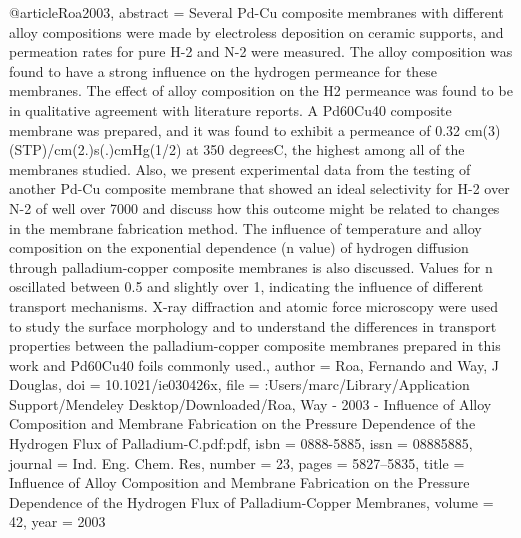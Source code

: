 @article{Roa2003,
abstract = {Several Pd-Cu composite membranes with different alloy compositions were made by electroless deposition on ceramic supports, and permeation rates for pure H-2 and N-2 were measured. The alloy composition was found to have a strong influence on the hydrogen permeance for these membranes. The effect of alloy composition on the H2 permeance was found to be in qualitative agreement with literature reports. A Pd60Cu40 composite membrane was prepared, and it was found to exhibit a permeance of 0.32 cm(3) (STP)/cm(2.)s(.)cmHg(1/2) at 350 degreesC, the highest among all of the membranes studied. Also, we present experimental data from the testing of another Pd-Cu composite membrane that showed an ideal selectivity for H-2 over N-2 of well over 7000 and discuss how this outcome might be related to changes in the membrane fabrication method. The influence of temperature and alloy composition on the exponential dependence (n value) of hydrogen diffusion through palladium-copper composite membranes is also discussed. Values for n oscillated between 0.5 and slightly over 1, indicating the influence of different transport mechanisms. X-ray diffraction and atomic force microscopy were used to study the surface morphology and to understand the differences in transport properties between the palladium-copper composite membranes prepared in this work and Pd60Cu40 foils commonly used.},
author = {Roa, Fernando and Way, J Douglas},
doi = {10.1021/ie030426x},
file = {:Users/marc/Library/Application Support/Mendeley Desktop/Downloaded/Roa, Way - 2003 - Influence of Alloy Composition and Membrane Fabrication on the Pressure Dependence of the Hydrogen Flux of Palladium-C.pdf:pdf},
isbn = {0888-5885},
issn = {08885885},
journal = {Ind. Eng. Chem. Res},
number = {23},
pages = {5827--5835},
title = {{Influence of Alloy Composition and Membrane Fabrication on the Pressure Dependence of the Hydrogen Flux of Palladium-Copper Membranes}},
volume = {42},
year = {2003}
}
